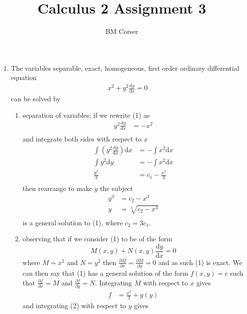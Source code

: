 \documentclass[10pt]{article}
\author{BM Corser}
\title{Calculus 2 Assignment 3}
\newcommand*{\dydx}[0]{\frac{\text{d}y}{\text{d}x}}
\newcommand*{\dy}[0]{\text{d}y}
\newcommand*{\dx}[0]{\text{d}x}
\newcommand*{\D}[2]{\frac{\partial{#1}}{\partial{#2}}}%
\begin{document}
    \maketitle 
    \begin{enumerate}
        \item The variables separable, exact, homogeneous, first order ordinary
            differential equation 
            \begin{align}
                x^2 + y^2\dydx = 0
            \end{align}
            can be solved by
    \begin{enumerate}
        \item separation of variables; if we rewrite (1) as
            \begin{align*}
                y^2\dydx &= -x^2 \\
            \end{align*}
            and integrate both sides with respect to $x$
            \begin{align*}
                \int \left(y^2\dydx\right)\dx &= -\int x^2 \dx \\
                \int y^2\dy &= -\int x^2 \dx \\
                \frac{y^3}{3} &= c_1 - \frac{x^3}{3} \\
            \end{align*}
            then rearrange to make $y$ the subject
            \begin{align*}
                y^3 &= c_2 - x^3 \\
                y &= \sqrt[3]{c_2-x^3} \\
            \end{align*}
                is a general solution to (1), where $c_2 = 3c_1$.
            \item observing that if we consider (1) to be of the form $$M(x,y) +
                N(x,y)\dydx = 0$$ where $M = x^2$ and $N = y^2$ then $\D{M}{x} =
                \D{M}{y} = 0$ and as such (1) is exact. We can then say that
                (1) has a general solution of the form $f(x,y) = c$ such that
                $\D{f}{x} = M$ and $\D{f}{y} = N$. Integrating $M$ with respect
                to $x$ gives
                \begin{align}
                    f &= \frac{x^3}{3} + g(y)
                \end{align}
                and integrating (2) with respect to $y$ gives
                \begin{align*}

\end{align*}
\end{enumerate}
\end{enumerate}
\end{document}
